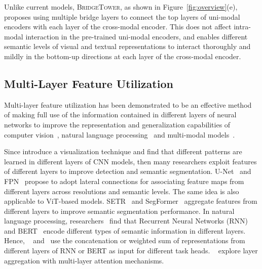 \documentclass[letterpaper]{article} %
\newcommand{\methodname}[0]{\textsc{BridgeTower}}
\begin{document}
Unlike current models, \methodname{}, as shown in Figure~\ref{fig:overview}(e), proposes using multiple bridge layers to connect the top layers of uni-modal encoders with each layer of the cross-modal encoder.
This does not affect intra-modal interaction in the pre-trained uni-modal encoders, and enables different semantic levels of visual and textual representations to interact thoroughly and mildly in the bottom-up directions at each layer of the cross-modal encoder.

\subsection{Multi-Layer Feature Utilization}
Multi-layer feature utilization has been demonstrated to be an effective method of making full use of the information contained in different layers of neural networks to improve the representation and generalization capabilities of computer vision~\citep{ronneberger2015u, liu2016ssd, lin2017feature, huang2017densely, yu2018deep, kirillov2019panoptic, zheng2021rethinking, xie2021segformer, naseer2021intriguing}, natural language processing~\citep{peters-etal-2018-deep, wang2018multi, shen2018dense, dou2018exploiting, jawahar-etal-2019-bert, sun2019fine, dou2019dynamic} and multi-modal models~\citep{dou2021meter,nagrani2021attention}.

Since \citet{zeiler2014visualizing} introduce a visualization technique and find that different patterns are learned in different layers of CNN models, then many researchers exploit features of different layers to improve detection and semantic segmentation. 
U-Net~\citep{ronneberger2015u} and FPN~\citep{lin2017feature} propose to adopt lateral connections for associating feature maps from different layers across resolutions and semantic levels. 
The same idea is also applicable to ViT-based models. SETR~\citep{zheng2021rethinking} and SegFormer~\citep{xie2021segformer} aggregate features from different layers to improve semantic segmentation performance.
In natural language processing, researchers~\citep{sogaard-goldberg-2016-deep, hashimoto2017joint, belinkov2017neural, peters-etal-2018-dissecting, jawahar-etal-2019-bert, liu2019linguistic} find that Recurrent Neural Networks (RNN)~\citep{hochreiter1997long} and BERT~\citep{devlin-etal-2019-bert} encode different types of semantic information in different layers. Hence, ~\citet{peters-etal-2018-deep} and~\citet{sun2019fine} use the concatenation or weighted sum of representations from different layers of RNN or BERT as input for different task heads. 
~\citet{dou2018exploiting} explore layer aggregation with multi-layer attention mechanisms.
\end{document}
